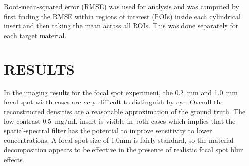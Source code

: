 \documentclass[]{spie}  %
\begin{document}
Root-mean-squared error (RMSE) was used for analysis and was computed by first finding the RMSE within regions of interest (ROIs) inside each cylindrical insert and then taking the mean across all ROIs. This was done separately for each target material.
   

\FloatBarrier


\section{RESULTS}


In the imaging results for the focal spot experiment, the 0.2~mm and 1.0~mm focal spot width cases are very difficult to distinguish by eye. Overall the reconstructed densities are a reasonable approximation of the ground truth. The low-contrast 0.5~mg/mL insert is visible in both cases which implies that the spatial-spectral filter has the potential to improve sensitivity to lower concentrations. A focal spot size of 1.0mm is fairly standard, so the material decomposition appears to be effective in the presence of realistic focal spot blur effects. 
\end{document}
